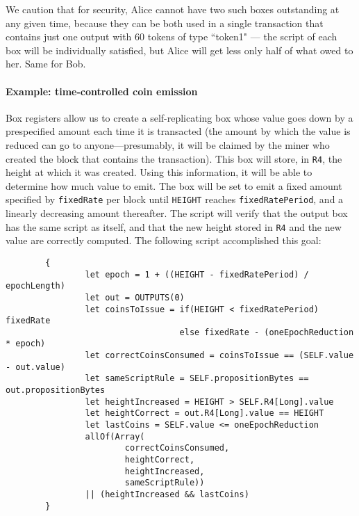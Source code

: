\documentclass[11pt]{article}
\newcommand{\authnote}[2]{\marginpar{\parbox{\marginparwidth}{\tiny %
  \textsf{#1 {\textcolor{blue}{notes: #2}}}}}%
  \textcolor{blue}{\textbf{\dag}}}
\newcommand{\authnote}[2]{
  \textsf{#1 \textcolor{blue}{: #2}}}
\newcommand{\authnote}[2]{}
\newcommand{\lnote}[1]{{\authnote{\textcolor{orange}{Leo notes}}{#1}}}
\begin{document}
We caution that for security, Alice cannot have two such boxes outstanding at any given time, because they can be both used in a single transaction that contains just one output with 60 tokens of type ``token1" --- the script of each box will be individually satisfied, but Alice will get less only half of what owed to her. Same for Bob.

\lnote{this seems like a pretty big security vulnerability and we should highlight it and show how to fix it. I haven't thought about how best to write a script that doesn't have it Maybe restricting the number of inputs and outputs to just 2 will work? Folding over all the inputs and outputs and summing up and making sure amounts are right may also work, though not sure how to handle all the different (unknowable in advance) token types. Or having a one-time pk just for this purpose (seems expensive)?}
\lnote{Bigger question: why do this instead of hash-based example?}

\paragraph{Example: time-controlled coin emission}
Box registers allow us to create a self-replicating box whose value goes down by a prespecified amount each time it is transacted (the amount by which the value is reduced can go to anyone---presumably, it will be claimed by the miner who created the block that contains the transaction). This box will store, in \texttt{R4}, the height at which it was created. Using this information, it will be able to determine how much value to emit. The box will be set to emit 
a fixed amount specified by \texttt{fixedRate} per block until \texttt{HEIGHT} reaches \texttt{fixedRatePeriod}, and a linearly decreasing amount thereafter. The script will verify that the output box has the same script as itself, and that the new height stored in \texttt{R4} and the new value are correctly computed. The following script accomplished this goal:
\begin{verbatim}
        {
                let epoch = 1 + ((HEIGHT - fixedRatePeriod) / epochLength)
                let out = OUTPUTS(0)
                let coinsToIssue = if(HEIGHT < fixedRatePeriod) fixedRate 
                                   else fixedRate - (oneEpochReduction * epoch)
                let correctCoinsConsumed = coinsToIssue == (SELF.value - out.value)
                let sameScriptRule = SELF.propositionBytes == out.propositionBytes
                let heightIncreased = HEIGHT > SELF.R4[Long].value
                let heightCorrect = out.R4[Long].value == HEIGHT
                let lastCoins = SELF.value <= oneEpochReduction
                allOf(Array(
                        correctCoinsConsumed, 
                        heightCorrect, 
                        heightIncreased, 
                        sameScriptRule)) 
                || (heightIncreased && lastCoins)
        }
\end{verbatim}
\end{document}

